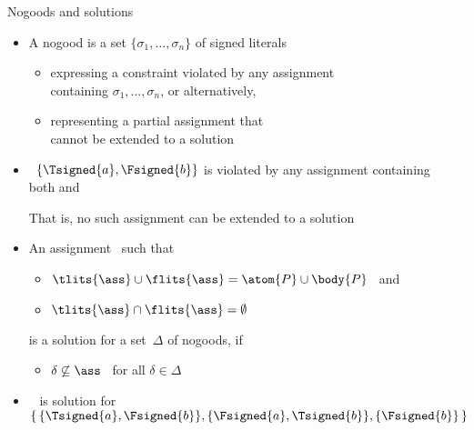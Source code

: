 \begin{frame}{Nogoods and solutions}
  \bigskip
  \begin{itemize}
  \item<2-> A \alert{nogood} is a set $\{\sigma_1,\ldots,\sigma_n\}$ of signed literals
    \begin{itemize}\normalsize
    \item<only@3-6> expressing a \alert{constraint} violated by any assignment
      \\containing $\sigma_1,\ldots,\sigma_n$, or alternatively,
    \item<only@3-6> representing a partial assignment that
      \\cannot be extended to a solution
      \medskip
    \end{itemize}
  \item<only@4 >  \ $\{\Tsigned{a},\Fsigned{b}\}$
    is violated by any assignment containing
    \\ both  and 
    \par\smallskip
    That is, no such assignment can be extended to a solution
  \item<only@6-> An assignment \ass\ such that
    \par\smallskip
    \begin{itemize}\normalsize
    \item \( \tlits{\ass} \cup \flits{\ass} = \atom{P}\cup\body{P} \) \ and
      \smallskip
    \item \( \tlits{\ass} \cap \flits{\ass} = \emptyset \)
    \end{itemize}
    \par\smallskip
    is a \alert{solution} for a set~$\Delta$ of nogoods,
    if
    \par\smallskip
    \begin{itemize}\normalsize
    \item $\delta\not\subseteq\ass$ \ for all $\delta\in\Delta$
    \end{itemize}
    \bigskip
  \item<only@8- >  \ 
    is  solution for
    \(
    \{\,\{\Tsigned{a},\Fsigned{b}\},\{\Fsigned{a},\Tsigned{b}\},\{\Fsigned{b}\}\,\}
    \)
  \end{itemize}
\end{frame}
